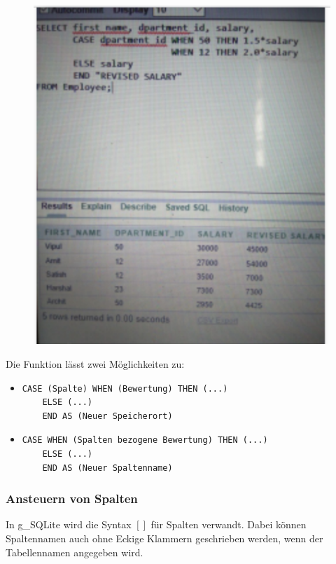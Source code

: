 \begin{figure}[H]
	\centering
	\includegraphics[scale = 0.3]{attachment/chapter_3/Scc059}
	\caption{}
	\label{fig:Scc059}
\end{figure}

Die Funktion lässt zwei Möglichkeiten zu:
\begin{itemize}
	\item \begin{lstlisting}[style=SQL]
	CASE (Spalte) WHEN (Bewertung) THEN (...)
	ELSE (...)
	END AS (Neuer Speicherort)
	\end{lstlisting}
	\item \begin{lstlisting}[style=SQL]
	CASE WHEN (Spalten bezogene Bewertung) THEN (...)
	ELSE (...)
	END AS (Neuer Spaltenname)
	\end{lstlisting}
\end{itemize}
\subsubsection{Ansteuern von Spalten}
In \gls{g_SQLite} wird die Syntax $[]$ für Spalten verwandt. Dabei können Spaltennamen auch ohne Eckige Klammern geschrieben werden, wenn der Tabellennamen angegeben wird.
 
